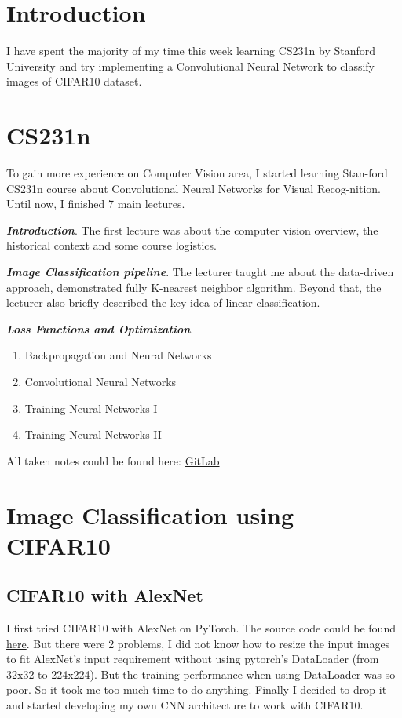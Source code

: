 \section{Introduction}
I have spent the majority of my time this week learning CS231n\cite{cs231n} by Stanford University and try implementing a Convolutional Neural Network to classify images of CIFAR10 dataset.

\section{CS231n}
To gain more experience on Computer Vision area, I started learning Stan-ford CS231n course about Convolutional Neural Networks for Visual Recog-nition. Until now, I finished 7 main lectures.

\textbf{\emph{Introduction}}. The first lecture was about the computer vision overview, the historical context and some course logistics.

\textbf{\emph{Image Classification pipeline}}. The lecturer taught me about the data-driven approach, demonstrated fully K-nearest neighbor algorithm. Beyond that, the lecturer also briefly described the key idea of linear classification.

\textbf{\emph{Loss Functions and Optimization}}. 

\begin{enumerate}

\item Backpropagation and Neural Networks
\item Convolutional Neural Networks
\item Training Neural Networks I
\item Training Neural Networks II
\end{enumerate}

All taken notes could be found here: \href{https://gitlab.com/tlvu2697/stanford--cs231n--visual-recognition}{GitLab}


\section{Image Classification using CIFAR10}
\subsection{CIFAR10 with AlexNet}
I first tried CIFAR10\cite{cifar} with AlexNet on PyTorch. The source code could be found \href{https://gitlab.com/tlvu2697/image-classification-cifar10/blob/master/cifar10-classification-alexnet.py}{here}. But there were 2 problems, I did not know how to resize the input images to fit AlexNet's input requirement without using pytorch's DataLoader (from 32x32 to 224x224). But the training performance when using DataLoader was so poor. So it took me too much time to do anything. Finally I decided to drop it and started developing my own CNN architecture to work with CIFAR10.

